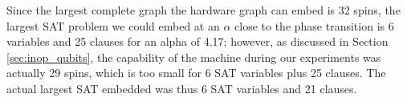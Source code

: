 Since the largest complete graph the hardware graph can embed is 32 spins, the largest SAT problem we could embed at an $\alpha$ close to the phase transition is 6 variables and 25 clauses for an alpha of 4.17; however, as discussed in Section \ref{sec:inop_qubits}, the capability of the \machine machine during our experiments was actually 29 spins, which is too small for 6 SAT variables plus 25 clauses.  The actual largest SAT embedded was thus 6 SAT variables and 21 clauses.

